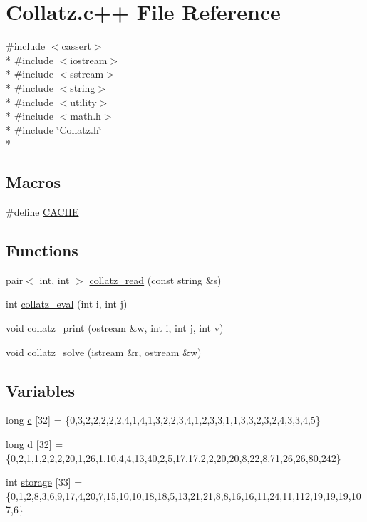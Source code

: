 \hypertarget{Collatz_8c_09_09}{\section{Collatz.\-c++ File Reference}
\label{Collatz_8c_09_09}
}
{\ttfamily \#include $<$cassert$>$}\\*
{\ttfamily \#include $<$iostream$>$}\\*
{\ttfamily \#include $<$sstream$>$}\\*
{\ttfamily \#include $<$string$>$}\\*
{\ttfamily \#include $<$utility$>$}\\*
{\ttfamily \#include $<$math.\-h$>$}\\*
{\ttfamily \#include \char`\"{}Collatz.\-h\char`\"{}}\\*
\subsection*{Macros}
\begin{DoxyCompactItemize}
\item 
\#define \hyperlink{Collatz_8c_09_09_a43fd55aa78bd891ebbd6a450f5eecce4}{C\-A\-C\-H\-E}
\end{DoxyCompactItemize}
\subsection*{Functions}
\begin{DoxyCompactItemize}
\item 
pair$<$ int, int $>$ \hyperlink{Collatz_8c_09_09_a2772f8a734aeab48332eb3b282f991ba}{collatz\-\_\-read} (const string \&s)
\item 
int \hyperlink{Collatz_8c_09_09_a0b0d3827a619c18aa4d96b8ee8b1c47d}{collatz\-\_\-eval} (int i, int j)
\item 
void \hyperlink{Collatz_8c_09_09_aeda0b7ea3e40e1e7487ccc436f33a559}{collatz\-\_\-print} (ostream \&w, int i, int j, int v)
\item 
void \hyperlink{Collatz_8c_09_09_a0ac646d2122741f9a9a52201bf9551cc}{collatz\-\_\-solve} (istream \&r, ostream \&w)
\end{DoxyCompactItemize}
\subsection*{Variables}
\begin{DoxyCompactItemize}
\item 
long \hyperlink{Collatz_8c_09_09_a9160a09deb1711108372467e0f49b551}{c} \mbox{[}32\mbox{]} = \{0,3,2,2,2,2,2,4,1,4,1,3,2,2,3,4,1,2,3,3,1,1,3,3,2,3,2,4,3,3,4,5\}
\item 
long \hyperlink{Collatz_8c_09_09_a12b98f69417e4e2643b390e987acddcb}{d} \mbox{[}32\mbox{]} = \{0,2,1,1,2,2,2,20,1,26,1,10,4,4,13,40,2,5,17,17,2,2,20,20,8,22,8,71,26,26,80,242\}
\item 
int \hyperlink{Collatz_8c_09_09_abf138feaaa93a33fa911a7f64e7ac902}{storage} \mbox{[}33\mbox{]} = \{0,1,2,8,3,6,9,17,4,20,7,15,10,10,18,18,5,13,21,21,8,8,16,16,11,24,11,112,19,19,19,107,6\}
\end{DoxyCompactItemize}


